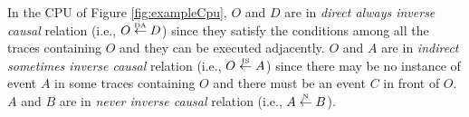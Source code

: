 \documentclass{llncs}
\begin{document}

\begin{example}
In the CPU of Figure \ref{fig:exampleCpu}, $O$ and $D$ are in \textit{direct always inverse causal} relation (i.e., $O\overset{\text{\tiny{DA}}}{\leftarrow}D$) since they satisfy the conditions among all the traces containing $O$ and they can be executed adjacently. $O$ and $A$ are in \textit{indirect sometimes inverse causal} relation (i.e., $O\overset{\text{\tiny{IS}}}{\leftarrow}A$) since there may be no instance of event $A$ in some traces containing $O$ and there must be an event $C$ in front of $O$. $A$ and $B$ are in \textit{never inverse causal} relation (i.e., $A\overset{\text{\tiny{N}}}{\leftarrow} B$).
\end{example}
\end{document}
